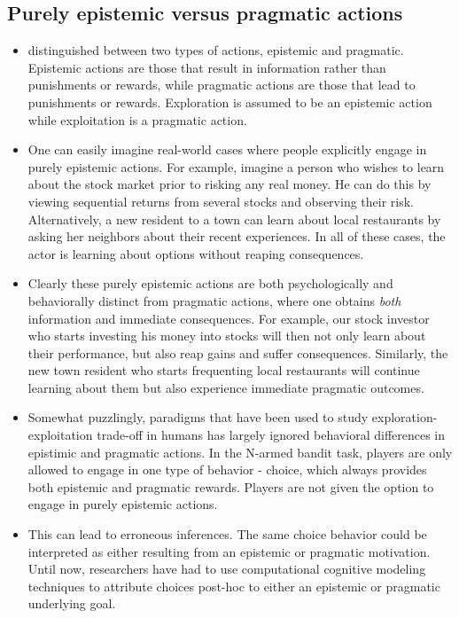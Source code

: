 \documentclass[a4paper,doc,natbib,floatsintext]{apa6}\usepackage[]{graphicx}\usepackage[]{color}
\begin{document}
\subsection{Purely epistemic versus pragmatic actions}

\begin{itemize}

  \item \cite{neth2008thinking} distinguished between two types of actions, epistemic and pragmatic. Epistemic actions are those that result in information rather than punishments or rewards, while pragmatic actions are those that lead to punishments or rewards. Exploration is assumed to be an epistemic action while exploitation is a pragmatic action.
  
  \item One can easily imagine real-world cases where people explicitly engage in purely epistemic actions. For example, imagine a person who wishes to learn about the stock market prior to risking any real money. He can do this by viewing sequential returns from several stocks and observing their risk. Alternatively, a new resident to a town can learn about local restaurants by asking her neighbors about their recent experiences. In all of these cases, the actor is learning about options without reaping consequences.
  
  \item Clearly these purely epistemic actions are both psychologically and behaviorally distinct from pragmatic actions, where one obtains \textit{both} information and immediate consequences. For example, our stock investor who starts investing his money into stocks will then not only learn about their performance, but also reap gains and suffer consequences. Similarly, the new town resident who starts frequenting local restaurants will continue learning about them but also experience immediate pragmatic outcomes.
  
  \item Somewhat puzzlingly, paradigms that have been used to study exploration-exploitation trade-off in humans has largely ignored behavioral differences in epistimic and pragmatic actions. In the N-armed bandit task, players are only allowed to engage in one type of behavior - choice, which always provides both epistemic and pragmatic rewards. Players are not given the option to engage in purely epistemic actions. 
  
  \item This can lead to erroneous inferences. The same choice behavior could be interpreted as either resulting from an epistemic or pragmatic motivation. Until now, researchers have had to use computational cognitive modeling techniques to attribute choices post-hoc to either an epistemic or pragmatic underlying goal.
  

\end{itemize}
\end{document}
